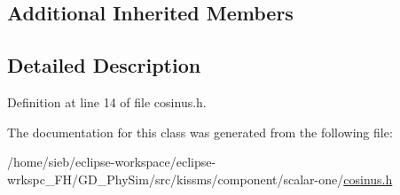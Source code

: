 \subsection*{Additional Inherited Members}


\subsection{Detailed Description}


Definition at line 14 of file cosinus.\-h.



The documentation for this class was generated from the following file\-:\begin{DoxyCompactItemize}
\item 
/home/sieb/eclipse-\/workspace/eclipse-\/wrkspc\-\_\-\-F\-H/\-G\-D\-\_\-\-Phy\-Sim/src/kissms/component/scalar-\/one/\hyperlink{cosinus_8h}{cosinus.\-h}\end{DoxyCompactItemize}
